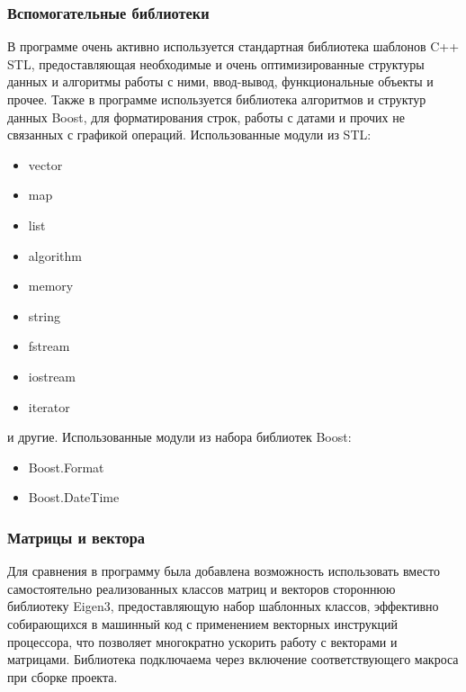 \documentclass[a4paper,12pt]{report}
\numberwithin{equation}{section}
\begin{document}
\subsubsection{Вспомогательные библиотеки}
В программе очень активно используется стандартная библиотека шаблонов C++ STL, предоставляющая необходимые и очень оптимизированные структуры данных и алгоритмы работы с ними, ввод-вывод, функциональные объекты и прочее. Также в программе используется библиотека алгоритмов и структур данных Boost, для форматирования строк, работы с датами и прочих не связанных с графикой операций. Использованные модули из STL:
\begin{itemize}
\item vector
\item map
\item list
\item algorithm
\item memory
\item string
\item fstream
\item iostream
\item iterator
\end{itemize}
и другие. Использованные модули из набора библиотек Boost:
\begin{itemize}
\item Boost.Format
\item Boost.DateTime
\end{itemize}

\subsubsection{Матрицы и вектора}
Для сравнения в программу была добавлена возможность использовать вместо самостоятельно реализованных классов матриц и векторов стороннюю библиотеку Eigen3, предоставляющую набор шаблонных классов, эффективно собирающихся в машинный код с применением векторных инструкций процессора, что позволяет многократно ускорить работу с векторами и матрицами. Библиотека подключаема через включение соответствующего макроса при сборке проекта.
\end{document}
